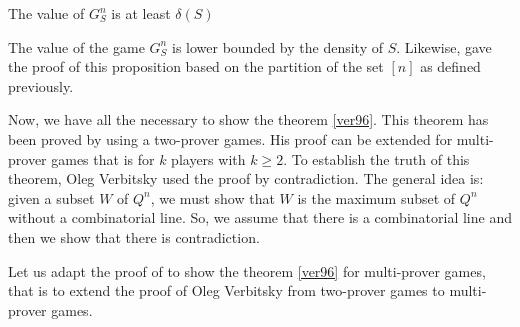 \begin{pro}	 The value of $G_S^n$ is at least $\delta(S)$	\end{pro}

The value of the game $G_S^n$ is lower bounded by the density of $S.$ Likewise, \cite{hkazla2016forbidden} gave the proof of this proposition based on the partition of the set $[n]$ as defined previously.

Now, we have all the necessary to show the theorem \eqref{ver96}. This theorem  has been proved by \cite{verbitsky1996towards} using a two-prover games.  His proof can be extended for  multi-prover games that is for $k$ players with $k\geq 2.$ To establish the truth of  this theorem, Oleg Verbitsky used the proof by contradiction. The general idea is: given a subset $W$ of $Q^n$, we must show that $W$ is  the maximum subset of $Q^n$ without a combinatorial line. So, we assume that there is a combinatorial line and then we show that there is  contradiction.

Let us adapt the proof of  \cite{verbitsky1996towards} to show the theorem \eqref{ver96} for multi-prover games, that is to extend the proof of Oleg Verbitsky from two-prover games to multi-prover games.


